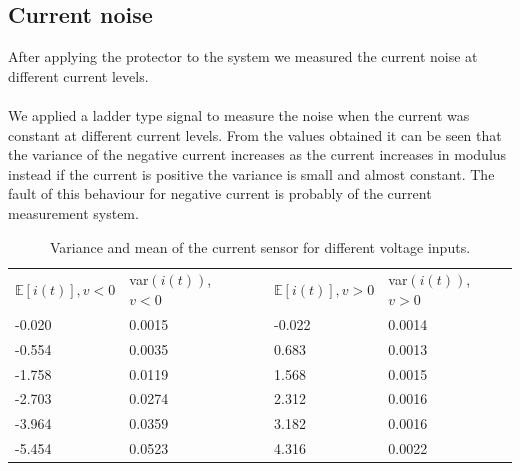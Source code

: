 \subsection{Current noise}
After applying the protector to the system we measured the current noise at different current levels.\\ \\
We applied a ladder type signal to measure the noise when the current was constant at different current levels. From the values obtained it can be seen that the variance of the negative current increases as the current increases in modulus instead if the current is positive the variance is small and almost constant. The fault of this behaviour for negative current is probably of the current measurement system.\\
\def\arraystretch{1.2}
\begin{table}[]
\centering
\caption{Variance and mean of the current sensor for different voltage inputs.}
\label{my-label}
\begin{tabular}{lllll}
\cline{1-2} \cline{4-5}
\multicolumn{1}{|l|}{$\mathbb{E}[i(t)], v < 0$} & \multicolumn{1}{l|}{var$(i(t))$, $v<0$} & \multicolumn{1}{l|}{} & \multicolumn{1}{l|}{$\mathbb{E}[i(t)], v >0$} & \multicolumn{1}{l|}{var$(i(t))$, $v>0$} \\ \cline{1-2} \cline{4-5} 
-0.020                                          & 0.0015                                  &                       & -0.022                                        & 0.0014                                  \\
-0.554                                          & 0.0035                                  &                       & 0.683                                         & 0.0013                                  \\
-1.758                                          & 0.0119                                  &                       & 1.568                                         & 0.0015                                  \\
-2.703                                          & 0.0274                                  &                       & 2.312                                         & 0.0016                                  \\
-3.964                                          & 0.0359                                  &                       & 3.182                                         & 0.0016                                  \\
-5.454                                          & 0.0523                                  &                       & 4.316                                         & 0.0022                                  \\ \cline{1-2} \cline{4-5} 
\end{tabular}
\end{table}

